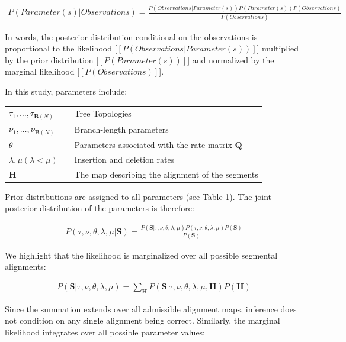 \documentclass[numsec,webpdf,modern,large,namedate]{oup-authoring-template}
\begin{document}
\begin{align}
\textit{P}(Parameter(s) | Observations)= \frac{\textit{P}(Observations | Parameter(s)) \textit{P}(Parameter(s))\textit{P}(Observations)}{\textit{P}(Observations)}
\end{align}

In words, the posterior distribution conditional on the observations is proportional to the likelihood [\hbox{$[\textit{P}(Observations | Parameter(s))]$}] multiplied by the prior distribution [\hbox{$[\textit{P}(Parameter(s))]$}] and normalized by the marginal likelihood [\hbox{$[\textit{P}(Observations)]$}]. 

In this study, parameters include:

\setlength{\tabcolsep}{0pt}
\begin{tabular}{b{72pt} b{20pt} b{288pt} }
$\tau _1, \ldots , \tau _{\mathbf{B}(\textit{N})}$ &  & Tree Topologies\\
$\nu _1, \ldots , \nu _{\mathbf{B}(\textit{N})}$ &  & Branch-length parameters\\
$\textit{$\theta$}$ &  & Parameters associated with the rate matrix $\mathbf{Q}$\\
$\lambda , \mu  (\lambda < \mu )$ &  & Insertion and deletion rates\\
$\mathbf{H}$ &  & The map describing the alignment of the segments\\
\end{tabular}

Prior distributions are assigned to all parameters (see Table 1). The joint posterior distribution of the parameters is therefore:

\begin{align}
\textit{P}(\tau , \nu , \textit{$\theta$}, \lambda , \mu \vert \mathbf{S})= \frac{\textit{P}(\mathbf{S}\vert \tau , \nu , \textit{$\theta$}, \lambda , \mu ) \textit{P}(\tau , \nu , \textit{$\theta$}, \lambda , \mu )\textit{P}(\mathbf{S})}{\textit{P}(\mathbf{S})}
\end{align}

We highlight that the likelihood is marginalized over all possible segmental alignments: 

\begin{align}
\textit{P}(\mathbf{S}\vert \tau , \nu , \textit{$\theta$}, \lambda , \mu )= \sum _{\mathbf{H}}{\textit{P}(\mathbf{S}\vert \tau , \nu , \textit{$\theta$}, \lambda , \mu , \mathbf{H}) \textit{P}(\mathbf{H})}
\end{align}

Since the summation extends over all admissible alignment maps, inference does not condition on any single alignment being correct. Similarly, the marginal likelihood integrates over all possible parameter values:
\end{document}
